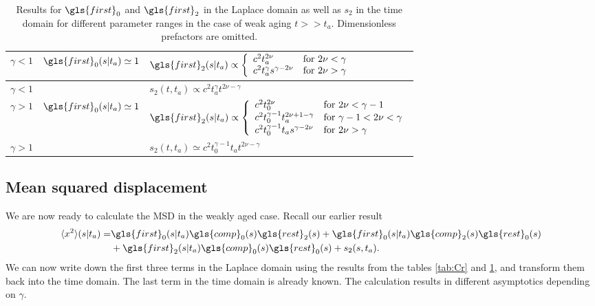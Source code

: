 \begin{center}
\begin{table}[h!]
 \begin{tabular}{||l|l|l||}
 \hline \hline
\rule[-4mm]{0cm}{1cm}   $\gamma<1$ & $\gls{first}_0(s|t_a) \simeq 1$ & $\gls{first}_2(s|t_a) \propto \left\{
\begin{array}{ll}
c^2 t_a^{2\nu}  & \mbox{for } 2\nu < \gamma \\
c^2 t_a^\gamma s^{\gamma-2\nu} & \mbox{for } 2\nu > \gamma
\end{array} \right. $\\ \hline
\rule[-4mm]{0cm}{1cm} $\gamma<1$ & $  $ & $s_2(t,t_a) \propto c^2 t_a^\gamma t^{2\nu -\gamma} $ \\ \hline
\rule[-4mm]{0cm}{1cm} $\gamma>1$ & $\gls{first}_0(s|t_a) \simeq 1$ & $\gls{first}_2(s|t_a) \propto \left\{
 \begin{array}{ll}
c^2  t_0^{2\nu} & \mbox{for } 2\nu < \gamma  -1     \\
  c^2  t_0^{\gamma-1} t_a^{2\nu +1- \gamma } & \mbox{for } \gamma-1 < 2\nu < \gamma \\
 c^2 t_0^{\gamma-1} t_a s^{\gamma - 2\nu} & \mbox{for } 2\nu > \gamma
 \end{array}
 \right. $ \\ \hline
\rule[-4mm]{0cm}{1cm} $\gamma>1$& & $s_2(t,t_a) \simeq c^2 t_0^{\gamma-1}  t_a t^{2\nu-\gamma}$ \\ \hline \hline
\end{tabular}
\caption{Results for $\gls{first}_0$ and $\gls{first}_2$ in the Laplace domain as well as $s_2$ in the time domain for different parameter ranges in the case of weak aging $t>>t_a$. Dimensionless prefactors are omitted.
\label{tab:sFweakAging}}
\end{table}
\end{center}



\subsection*{Mean squared displacement}

We are now ready to calculate the MSD in the weakly aged case. Recall our earlier result
\begin{align}
\langle x^2 \rangle (s|t_a) =&  \gls{first}_0(s|t_a) \gls{comp}_0(s) \gls{rest}_2(s) + \gls{first}_0(s|t_a) \gls{comp}_2(s) \gls{rest}_0(s)  \nonumber \\
& + \gls{first}_2(s|t_a) \gls{comp}_0(s) \gls{rest}_0(s) + s_{2}(s,t_a) .
\end{align}
We can now write down the first three terms in the Laplace domain using the results from the tables \ref{tab:Cr} and \ref{tab:sFweakAging}, and transform them back into the time domain.
The last term in the time domain is already known. The calculation results in different asymptotics depending on $\gamma$.

